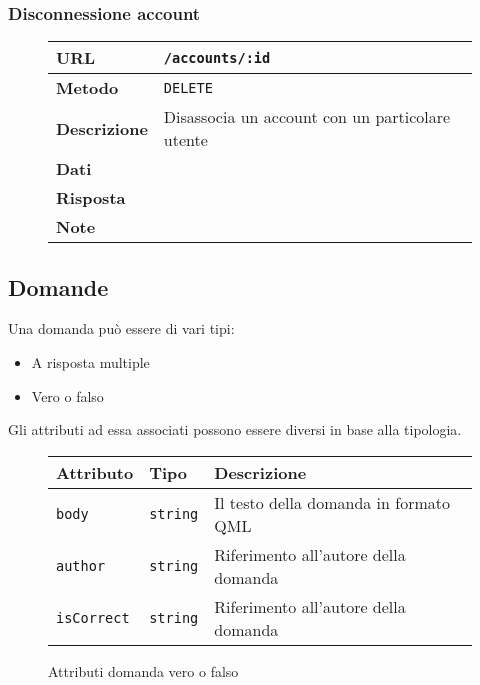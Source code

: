     \subsubsection{Disconnessione account}

        \begin{figure}
            \begin{tabular}{|l|l|} 
                \hline
                \textbf{URL} & \texttt{/accounts/:id} \\ \hline
                \textbf{Metodo} & \texttt{DELETE} \\ \hline
                \textbf{Descrizione} & 
                    Disassocia un account con un particolare utente \\ \hline
                \textbf{Dati} & \\ \hline
                \textbf{Risposta} & \\ \hline
                \textbf{Note} & \\ \hline
            \end{tabular}
        \end{figure}

\subsection{Domande}

    \par Una domanda può essere di vari tipi:
    \begin{itemize}
        \item A risposta multiple
        \item Vero o falso
    \end{itemize}

    \par Gli attributi ad essa associati possono essere diversi in base
    alla tipologia.

    \begin{figure}[H]
        \begin{tabular}{ | l | l | l | } 
        \hline
            Attributo & Tipo & Descrizione \\
        \hline
            \texttt{body} & \texttt{string} & 
                Il testo della domanda in formato QML \\
            \texttt{author} & \texttt{string} & 
                Riferimento all'autore della domanda \\
            \texttt{isCorrect} & \texttt{string} & 
                Riferimento all'autore della domanda \\
        \hline
        \end{tabular}
        \caption {Attributi domanda vero o falso}
    \end{figure}

